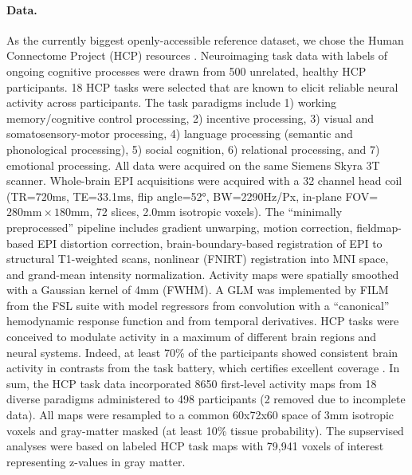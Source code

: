 \documentclass{article} %
\begin{document}
\paragraph{Data.}
As the currently biggest openly-accessible reference dataset,
we chose the Human Connectome Project (HCP) resources
\cite{barch2013}.
Neuroimaging task data with labels of ongoing cognitive processes
were drawn from 500 unrelated,
healthy HCP participants.
18 HCP tasks 
were selected that are known to elicit reliable neural activity
across participants.
The task paradigms include
1) working memory/cognitive control processing, 2)
incentive processing, 3) visual and somatosensory-motor processing,
4) language processing (semantic and phonological processing),
5) social cognition, 6) relational processing, and 7) emotional
processing. All data were acquired on the same Siemens Skyra 3T scanner.
Whole-brain EPI acquisitions were acquired with a
32 channel head coil (TR=720ms, TE=33.1ms, flip angle=52°, BW=2290Hz/Px,
in-plane FOV=$280\textrm{mm}\times180\textrm{mm}$, 72 slices, 2.0mm 
isotropic voxels).
The ``minimally preprocessed'' pipeline includes
gradient unwarping, motion correction, fieldmap-based EPI distortion
correction, brain-boundary-based registration of EPI to structural
T1-weighted scans, nonlinear (FNIRT) registration into MNI space,
and grand-mean intensity normalization. Activity maps were spatially
smoothed with a Gaussian kernel of 4mm (FWHM). A GLM was
implemented by FILM from the FSL suite with model regressors from convolution
with a “canonical” hemodynamic response function and from temporal derivatives.
HCP tasks were conceived to modulate activity
in a maximum of different brain regions and neural systems. Indeed, at
least 70\% of the participants showed consistent brain activity in
contrasts from the task battery, which certifies excellent
coverage \cite{barch2013}.
%
%
In sum, the HCP task data incorporated 8650 first-level activity maps
from 18 diverse paradigms administered to 498 participants (2 removed
due to incomplete data).
All maps were resampled to a common 60x72x60 space of
3mm isotropic voxels and gray-matter masked (at least 10\% tissue
probability).
The supservised analyses were based on labeled HCP task maps with
79,941 voxels of interest representing z-values in gray matter.
\end{document}
